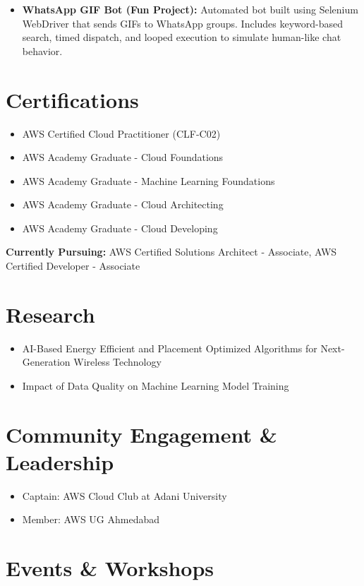 \documentclass[10pt,a4paper]{article}
\begin{document}
\begin{itemize}[leftmargin=*]
    \item \textbf{WhatsApp GIF Bot (Fun Project):} Automated bot built using Selenium WebDriver that sends GIFs to WhatsApp groups. Includes keyword-based search, timed dispatch, and looped execution to simulate human-like chat behavior.
\end{itemize}

\section*{Certifications}
\begin{itemize}
    \item AWS Certified Cloud Practitioner (CLF-C02)
    \item AWS Academy Graduate - Cloud Foundations
    \item AWS Academy Graduate - Machine Learning Foundations
    \item AWS Academy Graduate - Cloud Architecting
    \item AWS Academy Graduate - Cloud Developing
\end{itemize}
\textbf{Currently Pursuing:} AWS Certified Solutions Architect - Associate, AWS Certified Developer - Associate

\section*{Research}
\begin{itemize}
    \item AI-Based Energy Efficient and Placement Optimized Algorithms for Next-Generation Wireless Technology
    \item Impact of Data Quality on Machine Learning Model Training
\end{itemize}

\section*{Community Engagement \& Leadership}
\begin{itemize}
    \item Captain: AWS Cloud Club at Adani University
    \item Member: AWS UG Ahmedabad
\end{itemize}

\section*{Events \& Workshops}
\end{document}

